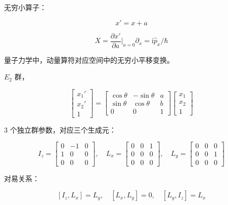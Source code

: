 无穷小算子：

\begin{equation}
x' = x+a
\end{equation}

\begin{equation}
X
=\frac{\partial x' }{\partial a } \bigg|_{a=0} \partial_x 
=\mathrm{i}\hat{p}_x/\hbar
\end{equation}

量子力学中，动量算符对应空间中的无穷小平移变换。

$E_2$ 群，

\begin{equation}
\begin{bmatrix}
x_1' \\
x_2' \\
1
\end{bmatrix}
=\begin{bmatrix}
\cos\theta &-\sin\theta &a \\
\sin\theta &\cos\theta &b \\
0 &0 &1
\end{bmatrix}
\begin{bmatrix}
x_1 \\
x_2 \\
1
\end{bmatrix}
\end{equation}

$3$ 个独立群参数，对应三个生成元：

\begin{equation}
I_z
=\begin{bmatrix}
0 &-1 &0 \\
1 &0 &0 \\
0 &0 &0
\end{bmatrix},\quad
L_x
=\begin{bmatrix}
0 &0 &1 \\
0 &0 &0 \\
0 &0 &0
\end{bmatrix},\quad
L_y
=\begin{bmatrix}
0 &0 &0 \\
0 &0 &1 \\
0 &0 &0
\end{bmatrix}
\end{equation}

对易关系：

\begin{equation}
\left[I_z , L_x \right] = L_y,\quad
\left[L_x , L_y \right] = 0,\quad
\left[L_y , I_z \right] = L_x
\end{equation}

